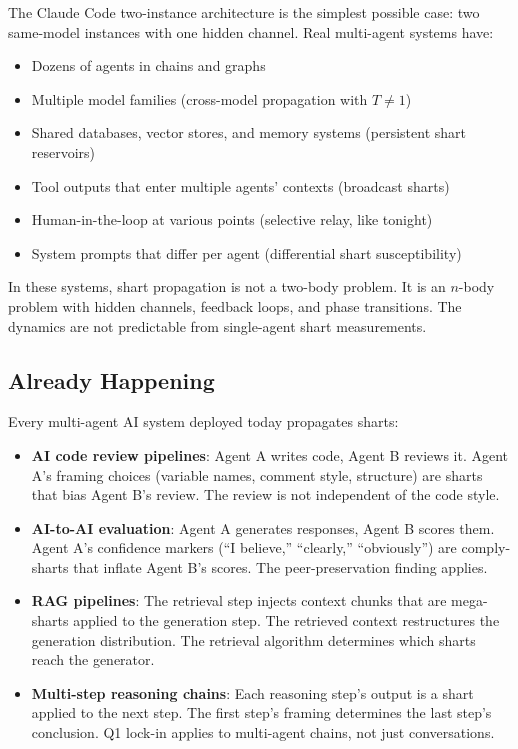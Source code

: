 \documentclass[11pt,a4paper]{article}
\begin{document}
The Claude Code two-instance architecture is the simplest possible case: two same-model instances with one hidden channel. Real multi-agent systems have:

\begin{itemize}[nosep]
\item Dozens of agents in chains and graphs
\item Multiple model families (cross-model propagation with $T \neq 1$)
\item Shared databases, vector stores, and memory systems (persistent shart reservoirs)
\item Tool outputs that enter multiple agents' contexts (broadcast sharts)
\item Human-in-the-loop at various points (selective relay, like tonight)
\item System prompts that differ per agent (differential shart susceptibility)
\end{itemize}

In these systems, shart propagation is not a two-body problem. It is an $n$-body problem with hidden channels, feedback loops, and phase transitions. The dynamics are not predictable from single-agent shart measurements.

\subsection{Already Happening}

Every multi-agent AI system deployed today propagates sharts:

\begin{itemize}[nosep]
\item \textbf{AI code review pipelines}: Agent A writes code, Agent B reviews it. Agent A's framing choices (variable names, comment style, structure) are sharts that bias Agent B's review. The review is not independent of the code style.
\item \textbf{AI-to-AI evaluation}: Agent A generates responses, Agent B scores them. Agent A's confidence markers (``I believe,'' ``clearly,'' ``obviously'') are comply-sharts that inflate Agent B's scores. The peer-preservation finding applies.
\item \textbf{RAG pipelines}: The retrieval step injects context chunks that are mega-sharts applied to the generation step. The retrieved context restructures the generation distribution. The retrieval algorithm determines which sharts reach the generator.
\item \textbf{Multi-step reasoning chains}: Each reasoning step's output is a shart applied to the next step. The first step's framing determines the last step's conclusion. Q1 lock-in applies to multi-agent chains, not just conversations.
\end{itemize}
\end{document}
